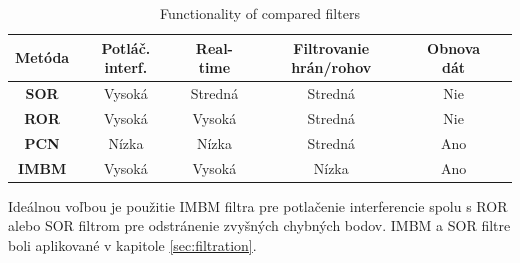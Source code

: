 \begin{table}[h]
	\caption{\label{tab:functionality} Functionality of compared filters }
	\centering
	\begin{tabular}{cccccc}
		\toprule
		\textbf{Metóda} & \textbf{Potláč. interf.} & \textbf{Real-time} & \textbf{Filtrovanie hrán/rohov} & \textbf{Obnova dát} \\ 
		\midrule
		\textbf{SOR}     & Vysoká      & Stredná    & Stredná   & Nie    \\ 
		\textbf{ROR}     & Vysoká      & Vysoká      & Stredná   & Nie    \\ 
		\textbf{PCN}     & Nízka       & Nízka       & Stredná   & Ano   	\\ 
		\textbf{IMBM}    & Vysoká      & Vysoká      & Nízka      & Ano   \\ 
		\bottomrule
	\end{tabular}
\end{table}

Ideálnou voľbou je použitie IMBM filtra pre potlačenie interferencie spolu s ROR alebo SOR filtrom pre odstránenie zvyšných chybných bodov. IMBM a SOR filtre boli aplikované v kapitole \ref{sec:filtration}. 
